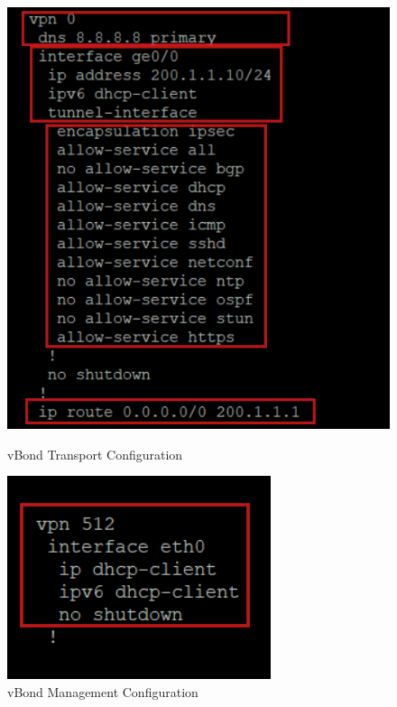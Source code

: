 \documentclass[12pt,english]{report}
\begin{document}
\begin{figure}[H]
    \begin{minipage}[b]{0.48\textwidth} %
        \centering
        \includegraphics[width=\textwidth]{chapitre 3/25.png}
        \caption{vBond Transport Configuration}
        \label{fig:vBond Transport Configuration}
    \end{minipage}
    \hfill %
    \begin{minipage}[b]{0.48\textwidth} %
        \centering
        \includegraphics[width=\textwidth]{chapitre 3/26.png}
        \caption{vBond Management Configuration}
        \label{fig:vBond Management Configuration}
    \end{minipage}
\end{figure}
\end{document}
